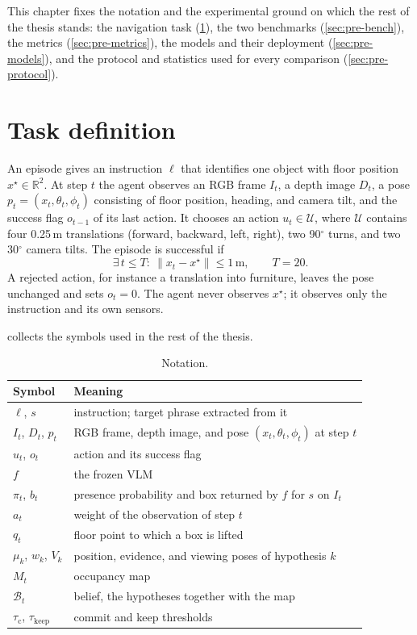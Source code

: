 \label{chap:prelim}
This chapter fixes the notation and the experimental ground on which the rest of the thesis stands: the navigation
task (\cref{sec:pre-task}), the two benchmarks (\cref{sec:pre-bench}), the metrics (\cref{sec:pre-metrics}), the
models and their deployment (\cref{sec:pre-models}), and the protocol and statistics used for every comparison
(\cref{sec:pre-protocol}).

\section{Task definition}
\label{sec:pre-task}
An episode gives an instruction $\ell$ that identifies one object with floor position $x^\star\in\mathbb{R}^2$. At
step $t$ the agent observes an RGB frame $I_t$, a depth image $D_t$, a pose $p_t=(x_t,\theta_t,\phi_t)$ consisting of
floor position, heading, and camera tilt, and the success flag $o_{t-1}$ of its last action. It chooses an action
$u_t\in\mathcal{U}$, where $\mathcal{U}$ contains four 0.25\,m translations (forward, backward, left, right), two
90$^\circ$ turns, and two 30$^\circ$ camera tilts. The episode is successful if
\begin{equation}
\exists\, t\le T:\ \lVert x_t-x^\star\rVert\le 1\,\text{m},\qquad T=20 .
\label{eq:success}
\end{equation}
A rejected action, for instance a translation into furniture, leaves the pose unchanged and sets $o_t=0$. The agent
never observes $x^\star$; it observes only the instruction and its own sensors.

 collects the symbols used in the rest of the thesis.

\begin{table}[htbp]
\centering\small
\caption{Notation.}
\label{tab:notation}
\begin{tabular*}{\linewidth}{@{\extracolsep{\fill}}ll@{}}
\toprule
Symbol & Meaning\\
\midrule
$\ell$, $s$ & instruction; target phrase extracted from it\\
$I_t$, $D_t$, $p_t$ & RGB frame, depth image, and pose $(x_t,\theta_t,\phi_t)$ at step $t$\\
$u_t$, $o_t$ & action and its success flag\\
$f$ & the frozen VLM\\
$\pi_t$, $b_t$ & presence probability and box returned by $f$ for $s$ on $I_t$\\
$a_t$ & weight of the observation of step $t$\\
$q_t$ & floor point to which a box is lifted\\
$\mu_k$, $w_k$, $V_k$ & position, evidence, and viewing poses of hypothesis $k$\\
$M_t$ & occupancy map\\
$\mathcal{B}_t$ & belief, the hypotheses together with the map\\
$\tau_\mathrm{c}$, $\tau_\mathrm{keep}$ & commit and keep thresholds\\
\bottomrule
\end{tabular*}
\end{table}

